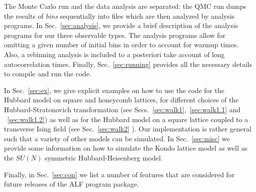 The Monte Carlo run and the  data analysis  are separated: the QMC run  dumps the results of \textit{bins}  sequentially into files  which are then analyzed by  analysis programs. In Sec.~\ref{sec:analysis}, we provide a brief description of the analysis programs  for our three observable types.  The analysis programs allow for omitting a given number of initial bins in order to account for warmup times. Also, a rebinning analysis is included  to a posteriori take  account of long autocorrelation times.  Finally, Sec.~\ref{sec:running} provides all the necessary details  to compile and run the code. 


In Sec.~\ref{sec:ex}, we  give explicit examples on how to use the code for  the  Hubbard model on square and honeycomb lattices,  for different choices of the Hubbard-Stratonovich transformation  (see Secs.~\ref{sec:walk1},~\ref{sec:walk1.1} and ~\ref{sec:walk1.2})  as well as for the Hubbard model on a square lattice coupled to a transverse Ising field (see Sec.~\ref{sec:walk2} ).   Our implementation is rather general such that  a variety of other models can be simulated. In Sec.~\ref{sec:misc}   we provide  some information on how to simulate the Kondo lattice model as well as the $SU(N)$ symmetric Hubbard-Heisenberg model. 

Finally, in Sec.~\ref{sec:con} we list a number of features that are considered for  future releases of the ALF program package.

